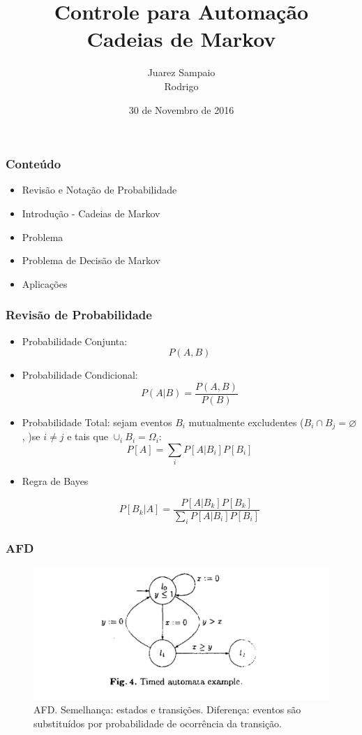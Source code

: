 \documentclass[brazil]{beamer}
\title{Controle para Automação \\ Cadeias de Markov}
\author{Juarez Sampaio \\ Rodrigo}
\institute{Universidade de Brasília}
\date{30 de Novembro de 2016}
\begin{document}
\begin{frame}
        \titlepage
\end{frame}

\begin{frame}[fragile]
  \frametitle{Conteúdo}
  \begin{itemize}
     \item Revisão e Notação de Probabilidade
     \item Introdução - Cadeias de Markov
     \item Problema
     \item Problema de Decisão de Markov
     \item Aplicações
  \end{itemize}
\end{frame}

\begin{frame}[fragile]
  \frametitle{Revisão de Probabilidade}

  \begin{itemize}
      \item Probabilidade Conjunta: 
        $$ P (A, B)$$ 
      \item Probabilidade Condicional: 
        $$P ( A | B ) = \frac{P(A,B)}{P(B)}$$
      \item Probabilidade Total:
      sejam eventos $B_i$ mutualmente excludentes ($B_i \cap B_j = \varnothing$,
      )se $i \neq j$ e tais que $\cup _i B_i = \Omega_i$:
      $$ P[A] = \sum_i P[A | B_i] P[B_i]$$
      \item Regra de Bayes

        $$P[B_k | A] = \frac{P[A | B_k] P[B_k]}{\sum_i P[A | B_i] P[B_i]}$$
  \end{itemize}

\end{frame}
\begin{frame}
  \frametitle{AFD}
      \begin{figure}
        \centering
        \includegraphics[width = 1.0\textwidth, keepaspectratio]{./img/automata.png}
        \caption{AFD. Semelhança: estados e transições. Diferença: eventos são
          substituídos por probabilidade de ocorrência da transição.
          \cite{sample} }
      \end{figure}
\end{frame}

\begin{frame}
    {\footnotesize
    
    
    }
\end{frame}
\end{document}
